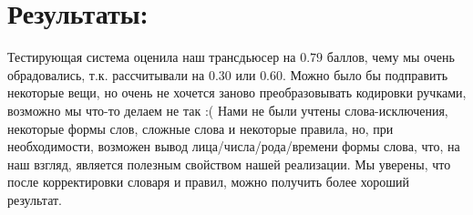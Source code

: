 \documentclass[12pt,a4paper]{article}
\begin{document}
\section{Результаты:}
\indent\indent
Тестирующая система оценила наш трансдьюсер на $0.79$ баллов, чему мы очень обрадовались, т.к. рассчитывали на $0.30$ или $0.60$. Можно было бы подправить некоторые вещи, но очень не хочется заново преобразовывать кодировки ручками, возможно мы что-то делаем не так :( Нами не были учтены слова-исключения, некоторые формы слов, сложные слова и некоторые правила, но, при необходимости, возможен вывод лица/числа/рода/времени формы слова, что, на наш взгляд, является полезным свойством нашей реализации. Мы уверены, что после корректировки словаря и правил, можно получить более хороший результат.
\end{document}
